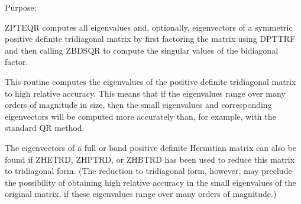  \begin{DoxyParagraph}{Purpose\+: }
\begin{DoxyVerb} ZPTEQR computes all eigenvalues and, optionally, eigenvectors of a
 symmetric positive definite tridiagonal matrix by first factoring the
 matrix using DPTTRF and then calling ZBDSQR to compute the singular
 values of the bidiagonal factor.

 This routine computes the eigenvalues of the positive definite
 tridiagonal matrix to high relative accuracy.  This means that if the
 eigenvalues range over many orders of magnitude in size, then the
 small eigenvalues and corresponding eigenvectors will be computed
 more accurately than, for example, with the standard QR method.

 The eigenvectors of a full or band positive definite Hermitian matrix
 can also be found if ZHETRD, ZHPTRD, or ZHBTRD has been used to
 reduce this matrix to tridiagonal form.  (The reduction to
 tridiagonal form, however, may preclude the possibility of obtaining
 high relative accuracy in the small eigenvalues of the original
 matrix, if these eigenvalues range over many orders of magnitude.)\end{DoxyVerb}
 
\end{DoxyParagraph}

